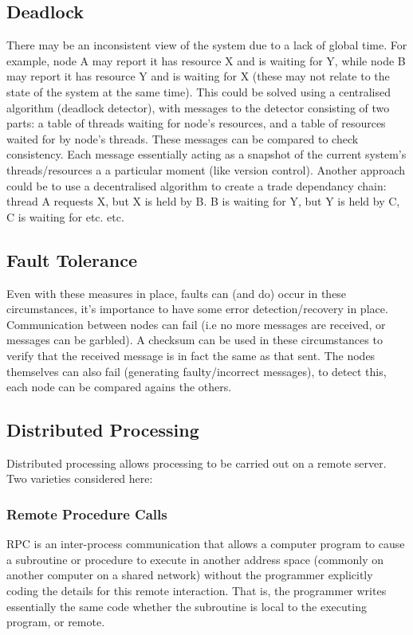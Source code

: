 \documentclass[a4paper,oneside]{report}
\begin{document}
    	\subsection{Deadlock}
    	There may be an inconsistent view of the system due to a lack of global time. For example, node A may report it has resource X and is waiting for Y, while node B may report it has resource Y and is waiting for X (these may not relate to the state of the system at the same time). This could be solved using a centralised algorithm (deadlock detector), with messages to the detector consisting of two parts: a table of threads waiting for node’s resources, and a table of resources waited for by node’s threads. These messages can be compared to check consistency. Each message essentially acting as a snapshot of the current system's threads/resources a a particular moment (like version control). Another approach could be to use a decentralised algorithm to create a trade dependancy chain: thread A requests X, but X is held by B. B is waiting for Y, but Y is held by C, C is waiting for etc. etc. 
    	
    	\subsection{Fault Tolerance}
    	Even with these measures in place, faults can (and do) occur in these circumstances, it's importance to have some error detection/recovery in place. Communication between nodes can fail (i.e no more messages are received, or messages can be garbled). A checksum can be used in these circumstances to verify that the received message is in fact the same as that sent. The nodes themselves can also fail (generating faulty/incorrect messages), to detect this, each node can be compared agains the others.
	
  	\subsection{Distributed Processing}
  	Distributed processing allows processing to be carried out on a remote server. Two varieties considered here:
  	
	  	\subsubsection{Remote Procedure Calls}
		RPC is an inter-process communication that allows a computer program to cause a subroutine or procedure to execute in another address space (commonly on another computer on a shared network) without the programmer explicitly coding the details for this remote interaction. That is, the programmer writes essentially the same code whether the subroutine is local to the executing program, or remote.\\
		
\end{document}
